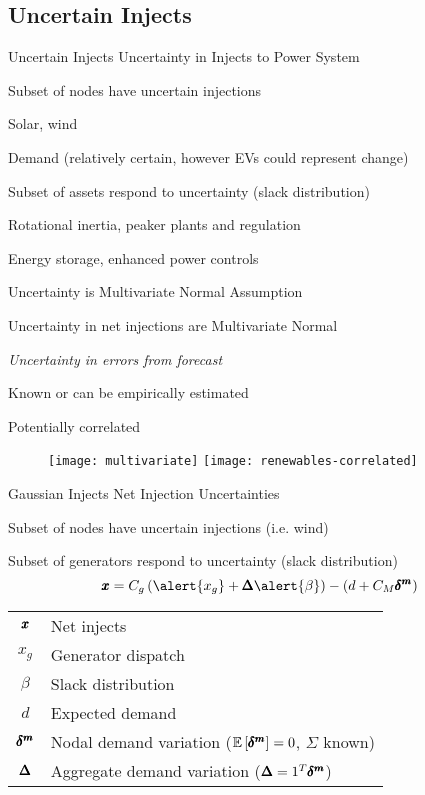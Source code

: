 
\subsection{Uncertain Injects}
\begin{frame}{Uncertain Injects}
\alert{Uncertainty in Injects to Power System}
\bi
\item Subset of nodes have uncertain injections
\bi
\item Solar, wind
\item Demand (relatively certain, however EVs could represent change)
\ei
\pause
\item Subset of assets respond to uncertainty (slack distribution)
\bi
\item Rotational inertia, peaker plants and regulation
\item Energy storage, enhanced power controls
\ei
\ei
\end{frame}


\begin{frame}{Uncertainty is Multivariate Normal}
\alert{Assumption}

Uncertainty in net injections are Multivariate Normal
\bi
\item \textit{Uncertainty in errors from forecast}
\item Known or can be empirically estimated
\item Potentially correlated
\ei
\begin{center}
\begin{figure}
   \texttt{[image: multivariate]}
   \hfill
   \texttt{[image: renewables-correlated]}
\end{figure}
\end{center}

\end{frame}


\begin{frame}{Gaussian Injects}
\alert{Net Injection Uncertainties}
\bi
\item Subset of nodes have uncertain injections (i.e. wind)
\item Subset of generators respond to uncertainty (slack distribution)
\ei
\pause
\begin{equation*}
 \rx = C_g\left(\alert{x_g}+\rD\alert{\beta}\right) - (d + C_M \ri) 
\end{equation*}

\pause
\begin{tabular}{ c l}
$\pmb{x}$ & Net injects \\
$x_g$ & Generator dispatch \\
$\beta$ & Slack distribution \\
$d$ & Expected demand \\
$\pmb{\delta^m}$ & Nodal demand variation ($\mathbb{E} \left[ \pmb{\delta^m} \right] = 0$, $\Sigma$ known)\\
$\pmb{\Delta}$ & Aggregate demand variation ($\pmb{\Delta} = 1^T \pmb{\delta^m}$)
\end{tabular}
\end{frame}


